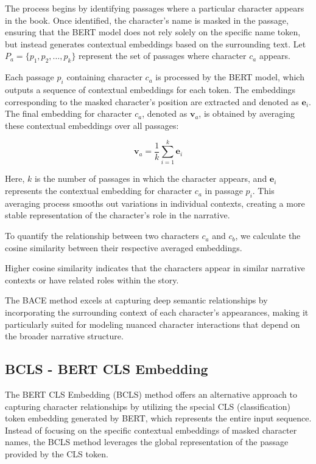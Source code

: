 \documentclass[a4paper,12pt]{report}
\begin{document}
The process begins by identifying passages where a particular character appears in the book. Once identified, the character's name is masked in the passage, ensuring that the BERT model does not rely solely on the specific name token, but instead generates contextual embeddings based on the surrounding text. Let $P_a = \{p_1, p_2, \dots, p_k\}$ represent the set of passages where character $c_a$ appears.

Each passage $p_i$ containing character $c_a$ is processed by the BERT model, which outputs a sequence of contextual embeddings for each token. The embeddings corresponding to the masked character's position are extracted and denoted as $\mathbf{e}_i$. The final embedding for character $c_a$, denoted as $\mathbf{v}_a$, is obtained by averaging these contextual embeddings over all passages:

\[
\mathbf{v}_a = \frac{1}{k} \sum_{i=1}^{k} \mathbf{e}_i
\]

Here, $k$ is the number of passages in which the character appears, and $\mathbf{e}_i$ represents the contextual embedding for character $c_a$ in passage $p_i$. This averaging process smooths out variations in individual contexts, creating a more stable representation of the character's role in the narrative.

To quantify the relationship between two characters $c_a$ and $c_b$, we calculate the cosine similarity between their respective averaged embeddings.

Higher cosine similarity indicates that the characters appear in similar narrative contexts or have related roles within the story.

The BACE method excels at capturing deep semantic relationships by incorporating the surrounding context of each character's appearances, making it particularly suited for modeling nuanced character interactions that depend on the broader narrative structure.

\subsection{BCLS - BERT CLS Embedding}
\label{BCLS}
The BERT CLS Embedding (BCLS) method offers an alternative approach to capturing character relationships by utilizing the special CLS (classification) token embedding generated by BERT, which represents the entire input sequence. Instead of focusing on the specific contextual embeddings of masked character names, the BCLS method leverages the global representation of the passage provided by the CLS token.
\end{document}
